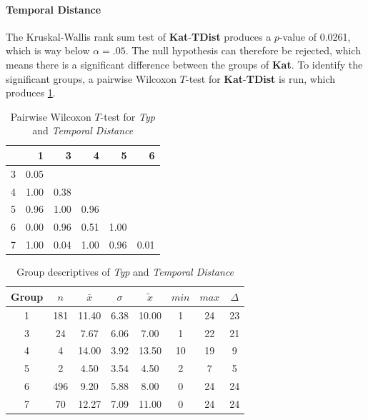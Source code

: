 \paragraph{Temporal Distance}
The Kruskal-Wallis rank sum test of \textbf{Kat}-\textbf{TDist} produces a $p$-value of 0.0261, which is way below $\alpha=.05$. The null hypothesis can therefore be rejected, which means there is a significant difference between the groups of \textbf{Kat}. To identify the significant groups, a pairwise Wilcoxon $T$-test for \textbf{Kat}-\textbf{TDist} is run, which produces \cref{tbl:wilcoxon_baysis_initiator_Typ_TDist}. 
\begin{table}[ht]
	\small
	\centering
    \begin{tabular}{rrrrrr}
        \toprule
        & 1 & 3 & 4 & 5 & 6 \\ 
        \midrule
        3 & 0.05 &  &  &  &  \\ 
        4 & 1.00 & 0.38 &  &  &  \\ 
        5 & 0.96 & 1.00 & 0.96 &  &  \\ 
        6 & 0.00 & 0.96 & 0.51 & 1.00 &  \\ 
        7 & 1.00 & 0.04 & 1.00 & 0.96 & 0.01 \\ 
        \bottomrule
    \end{tabular}
    \caption{Pairwise Wilcoxon $T$-test for \textit{Typ} and \textit{Temporal Distance}}
    \label{tbl:wilcoxon_baysis_initiator_Typ_TDist}
\end{table}
\begin{table}[ht]
	\small
	\centering
    \begin{tabular}{c|c|c|c|c|c|c|c}
        \toprule
        Group & $n$ & $\bar{x}$ & $\sigma$ & $\tilde{x}$ & $min$ & $max$ & $\Delta$ \\
        \midrule
        1 & 181 & 11.40 & 6.38 & 10.00 & 1  & 24 & 23 \\ 
        3 & 24  & 7.67  & 6.06 & 7.00  & 1  & 22 & 21 \\ 
        4 & 4   & 14.00 & 3.92 & 13.50 & 10 & 19 & 9 \\ 
        5 & 2   & 4.50  & 3.54 & 4.50  & 2  & 7  & 5 \\ 
        6 & 496 & 9.20  & 5.88 & 8.00  & 0  & 24 & 24 \\ 
        7 & 70  & 12.27 & 7.09 & 11.00 & 0  & 24 & 24 \\ 
        \bottomrule
    \end{tabular}
    \caption{Group descriptives of \textit{Typ} and \textit{Temporal Distance}}
    \label{tbl:descriptives_baysis_initiator_Typ_TDist}
\end{table}

